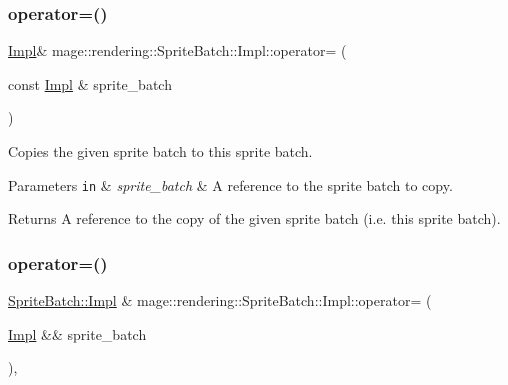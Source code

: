 \subsubsection{\texorpdfstring{operator=()}{operator=()}\hspace{0.1cm}{\footnotesize\ttfamily [1/2]}}
{\footnotesize\ttfamily \hyperlink{classmage_1_1rendering_1_1_sprite_batch_1_1_impl}{Impl}\& mage\+::rendering\+::\+Sprite\+Batch\+::\+Impl\+::operator= (\begin{DoxyParamCaption}\item[{const \hyperlink{classmage_1_1rendering_1_1_sprite_batch_1_1_impl}{Impl} \&}]{sprite\+\_\+batch }\end{DoxyParamCaption})\hspace{0.3cm}{\ttfamily [delete]}}

Copies the given sprite batch to this sprite batch.


\begin{DoxyParams}[1]{Parameters}
\mbox{\tt in}  & {\em sprite\+\_\+batch} & A reference to the sprite batch to copy. \\
\hline
\end{DoxyParams}
\begin{DoxyReturn}{Returns}
A reference to the copy of the given sprite batch (i.\+e. this sprite batch). 
\end{DoxyReturn}
\hypertarget{classmage_1_1rendering_1_1_sprite_batch_1_1_impl_a46daa28e38d091e3d9050dca282b90aa}{}\label{classmage_1_1rendering_1_1_sprite_batch_1_1_impl_a46daa28e38d091e3d9050dca282b90aa} 
\subsubsection{\texorpdfstring{operator=()}{operator=()}\hspace{0.1cm}{\footnotesize\ttfamily [2/2]}}
{\footnotesize\ttfamily \hyperlink{classmage_1_1rendering_1_1_sprite_batch_1_1_impl}{Sprite\+Batch\+::\+Impl} \& mage\+::rendering\+::\+Sprite\+Batch\+::\+Impl\+::operator= (\begin{DoxyParamCaption}\item[{\hyperlink{classmage_1_1rendering_1_1_sprite_batch_1_1_impl}{Impl} \&\&}]{sprite\+\_\+batch }\end{DoxyParamCaption})\hspace{0.3cm}{\ttfamily [default]}, {\ttfamily [noexcept]}}

